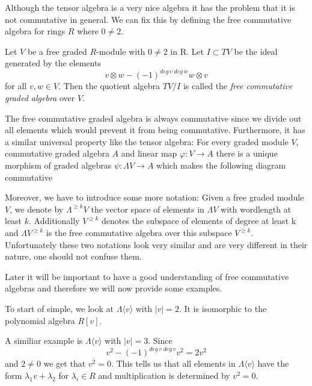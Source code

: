 Although the tensor algebra is a very nice algebra it has the problem that it is not commutative in general. We can fix this by
defining the free commutative algebra for rings $R$ where $0 \neq 2$.

\begin{Definition}
 Let $V$ be a free graded $R$-module with $0 \neq 2$ in R. Let $I \subset TV$ be the ideal generated by the elements
 $$ v \otimes w - (-1)^{deg \, v \; deg \, w} w \otimes v$$
 for all $v,w \in V$. Then the quotient algebra $TV/I$ is called the \emph{free commutative graded algebra} over $V$.
\end{Definition}

The free commutative graded algebra is always commutative since we divide out all elements which would prevent it 
from being commutative. Furthermore, it has a similar universal property like the tensor algebra: For every graded
module $V$, commutative graded algebra $A$ and linear map $\varphi \colon V \to A$ there is a unique morphism of
graded algebras $\psi \colon \Lambda V \to A$ which makes the following diagram commutative

 

\centerline{
}



Moreover, we have to introduce some more notation: Given a free graded module $V$, we denote 
by $\Lambda^{\geq k} V$ the vector space of elements in $\Lambda V$ with wordlength at least $k$.
Additionally $V^{\geq k}$ denotes the subspace of elements of degree at least k and ${\Lambda V}^{\geq k}$ 
is the free commutative algebra over this subspace $V^{\geq k}$. Unfortunately these two notations look 
very similar and are very different in their nature, one should not confuse them.

\par

Later it will be important to have a good understanding of free commutative algebras and therefore
we will now provide some examples.

\begin{Example}
 To start of simple, we look at $\Lambda \langle v \rangle$ with $|v| = 2$. 
 It is isomorphic to the polynomial algebra $R[v]$.
\end{Example}

\begin{Example}
 A similiar example is $\Lambda \langle v \rangle$ with $|v| = 3$. Since 
 $$ v^2 - (-1)^{deg \, v \; deg \, v} v^2 = 2 v^2$$
 and $2 \neq 0$ we get that $v^2 = 0$. This tells us that all elements in $\Lambda \langle v \rangle$
 have the form $\lambda_1 v + \lambda_2$ for $\lambda_i \in R$ and multiplication is determined by $v^2 = 0$.
\end{Example}

